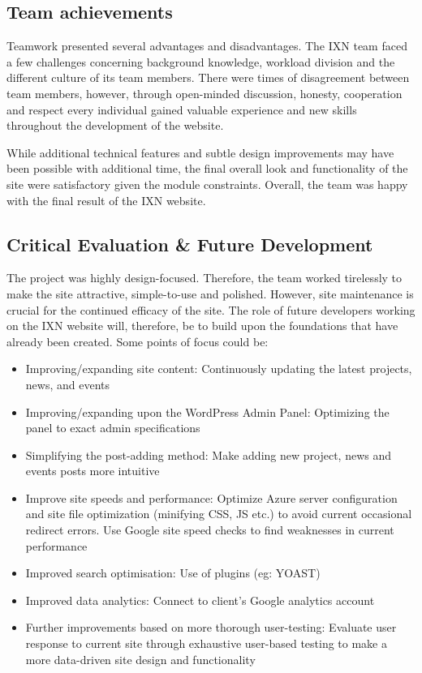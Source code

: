 \documentclass[fontsize=10pt]{extarticle}
\numberwithin{figure}{section} %
\providecommand{\tightlist}{%
  \setlength{\itemsep}{0pt}\setlength{\parskip}{0pt}}
\begin{document}
\hypertarget{team-achievements}{%
\subsection{Team achievements}\label{team-achievements}}

Teamwork presented several advantages and disadvantages. The IXN team
faced a few challenges concerning background knowledge, workload
division and the different culture of its team members. There were times
of disagreement between team members, however, through open-minded
discussion, honesty, cooperation and respect every individual gained
valuable experience and new skills throughout the development of the
website.

While additional technical features and subtle design improvements may
have been possible with additional time, the final overall look and
functionality of the site were satisfactory given the module
constraints. Overall, the team was happy with the final result of the
IXN website.

\hypertarget{critical-evaluation-future-development}{%
\subsection{Critical Evaluation \& Future
Development}\label{critical-evaluation-future-development}}

The project was highly design-focused. Therefore, the team worked
tirelessly to make the site attractive, simple-to-use and polished.
However, site maintenance is crucial for the continued efficacy of the
site.\cite{g8} The role of future developers working on the IXN website
will, therefore, be to build upon the foundations that have already been
created. Some points of focus could be:

\begin{itemize}
\tightlist
\item
  Improving/expanding site content: Continuously updating the latest
  projects, news, and events
\item
  Improving/expanding upon the WordPress Admin Panel: Optimizing the
  panel to exact admin specifications
\item
  Simplifying the post-adding method: Make adding new project, news and
  events posts more intuitive
\item
  Improve site speeds and performance: Optimize Azure server
  configuration and site file optimization (minifying CSS, JS etc.) to
  avoid current occasional redirect errors. Use Google site speed checks
  to find weaknesses in current performance
\item
  Improved search optimisation: Use of plugins (eg: YOAST)
\item
  Improved data analytics: Connect to client's Google analytics account
\item
  Further improvements based on more thorough user-testing: Evaluate
  user response to current site through exhaustive user-based testing to
  make a more data-driven site design and functionality
\end{itemize}
\end{document}
